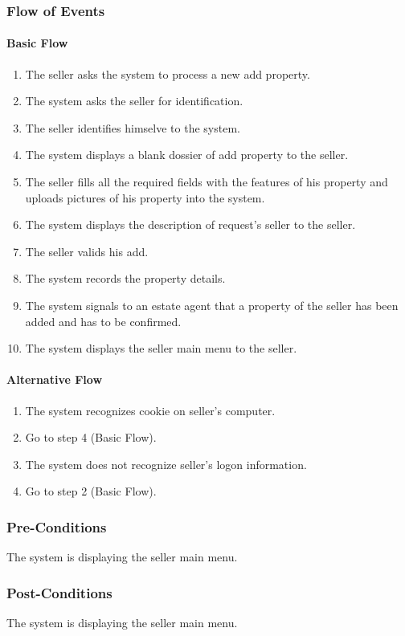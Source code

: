 \documentclass[a4paper,12pt]{article}
\begin{document}
\subsubsection{Flow of Events}
\paragraph{Basic Flow}
\begin{enumerate}
\item The seller asks the system to process a new add property.
\item The system asks the seller for identification.
\item The seller identifies himselve to the system.
\item The system displays a blank dossier of add property to the seller.
\item The seller fills all the required fields with the features of his property and uploads pictures of his property into the system.
\item The system displays the description of request's seller to the seller.
\item The seller valids his add.
\item The system records the property details.
\item The system signals to an estate agent that a property of the seller has been added and has to be confirmed.
\item The system displays the seller main menu to the seller.
\end{enumerate}
\paragraph{Alternative Flow}
\begin{enumerate}
\item The system recognizes cookie on seller's computer. 
\item Go to step 4 (Basic Flow).
\item The system does not recognize seller's logon information.
\item Go to step 2 (Basic Flow).
\end{enumerate}
\subsubsection{Pre-Conditions}
The system is displaying the seller main menu.
\subsubsection{Post-Conditions}
The system is displaying the seller main menu.
\end{document}
